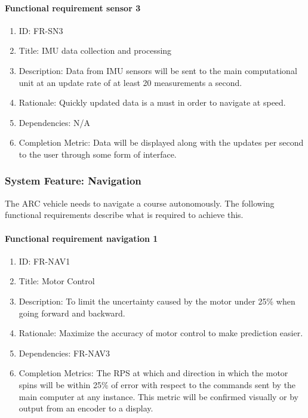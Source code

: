 \documentclass[compsoc,draftclsnofoot,onecolumn,10pt]{IEEEtran}
\begin{document}
	\paragraph{Functional requirement sensor 3}
    		\begin{enumerate}
    			\item ID: FR-SN3
    			\item Title: IMU data collection and processing
    			\item Description: Data from IMU sensors will be sent to the main computational unit at an update rate of at least 20 measurements a second. 
    			\item Rationale: Quickly updated data is a must in order to navigate at speed.
    			\item Dependencies: N/A
			\item Completion Metric: Data will be displayed along with the updates per second to the user through some form of interface.
    		\end{enumerate}

\subsubsection{System Feature: Navigation}
The ARC vehicle needs to navigate a course autonomously. The following functional
requirements describe what is required to achieve this.\par

	\paragraph{Functional requirement navigation 1}
		\begin{enumerate}
			\item ID: FR-NAV1
			\item Title: Motor Control
			\item Description: To limit the uncertainty caused by the motor under 25\% when going forward and backward.
			\item Rationale: Maximize the accuracy of motor control to make prediction easier.
			\item Dependencies: FR-NAV3
			\item Completion Metrics: The RPS at which and direction in which the motor spins will be within 25\% of error with respect to the commands sent by the main computer at any instance. 
			This metric will be confirmed visually or by output from an encoder to a display.
		\end{enumerate}
\end{document}
